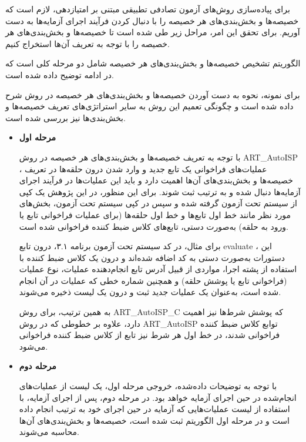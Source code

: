برای پیاده‌سازی روش‌های آزمون تصادفی تطبیقی مبتنی بر امتیازدهی، لازم است که خصیصه‌ها و بخش‌بندی‌های هر خصیصه را با دنبال کردن فرآیند اجرای آزمایه‌ها به دست آوریم. برای تحقق این امر، مراحل زیر طی شده است تا خصیصه‌ها و بخش‌بندی‌های هر خصیصه را با توجه به تعریف آن‌ها استخراج کنیم.


الگوریتم تشخیص خصیصه‌ها و بخش‌بندی‌های هر خصیصه شامل دو مرحله کلی است که در ادامه توضیح داده شده است.

برای نمونه، نحوه به دست آوردن خصیصه‌ها و بخش‌بندی‌های هر خصیصه در روش  شرح داده شده است و چگونگی تعمیم این روش به سایر استراتژی‌های تعریف خصیصه‌ها و بخش‌بندی‌ها نیز بررسی شده است.

\begin{itemize}
	\item\textbf{مرحله اول}

با توجه به تعریف خصیصه‌ها و بخش‌بندی‌های هر خصیصه در روش ART\_AutoISP ، عملیات‌های فراخوانی یک تابع جدید و وارد شدن درون حلقه‌ها در تعریف خصیصه‌ها و بخش‌بندی‌های آن‌ها اهمیت دارد و باید این عملیات‌ها در فرآیند اجرای آزمایه‌ها دنبال شده و به ترتیب ثبت شوند. برای این منظور، در این پژوهش یک کپی از سیستم تحت آزمون گرفته شده و سپس در کپی سیستم تحت آزمون، بخش‌های مورد نظر مانند خط اول تابع‌ها و خط اول حلقه‌ها (برای عملیات فراخوانی تابع یا ورود به حلقه) به‌صورت دستی، تابع‌های کلاس ضبط کننده فراخوانی شده است.

برای مثال، در کد سیستم تحت آزمون برنامه ۳.۱، درون تابع evaluate ، این دستورات به‌صورت دستی به کد اضافه شده‌اند و درون یک کلاس ضبط کننده با استفاده از پشته اجرا، مواردی از قبیل آدرس تابع انجام‌دهنده عملیات، نوع عملیات (فراخوانی تابع یا پوشش حلقه) و همچنین شماره خطی که عملیات در آن انجام شده است، به‌عنوان یک عملیات جدید ثبت و درون یک لیست ذخیره می‌شوند.

\newpage
\begin{figure}[!h]
	\begin{LTR}
		\singlespacing
		
	\end{LTR}
\end{figure}

به همین ترتیب، برای روش ART\_AutoISP\_C که پوشش شرط‌ها نیز اهمیت دارد، علاوه بر خطوطی که در روش ART\_AutoISP توابع کلاس ضبط کننده فراخوانی شدند، در خط اول هر شرط نیز تابع  از کلاس ضبط کننده فراخوانی می‌شود.

	\item \textbf{مرحله دوم}

با توجه به توضیحات داده‌شده، خروجی مرحله اول، یک لیست از عملیات‌های انجام‌شده در حین اجرای آزمایه خواهد بود. در مرحله دوم، پس از اجرای آزمایه، با استفاده از لیست عملیات‌هایی که آزمایه در حین اجرای خود به ترتیب انجام داده است و در مرحله اول الگوریتم ثبت شده است، خصیصه‌ها و بخش‌بندی‌های آن‌ها محاسبه می‌شوند.

\end{itemize}

